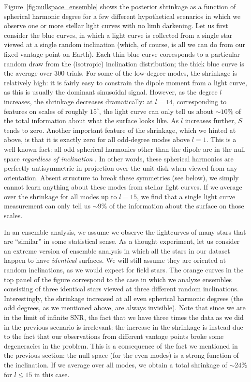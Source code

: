 \documentclass[modern]{aastex62}
\begin{document}
Figure~\ref{fig:nullspace_ensemble} shows the posterior shrinkage
as a function of spherical harmonic degree for a few different hypothetical
scenarios in which we observe one or more stellar light curves with
no limb darkening.
Let us first consider the blue curves, in which a light curve is
collected from a single star viewed at a single random inclination (which, of course, is
all we can do from our fixed vantage point on Earth).
Each thin blue curve corresponds to a particular random draw from the (isotropic)
inclination distribution; the thick blue curve is the average over 300 trials.
For some of the low-degree modes, the shrinkage is relatively high: it is
fairly easy to constrain the dipole moment from a light curve, as this is
usually the dominant sinusoidal signal. However, as the degree $l$
increases, the shrinkage decreases dramatically: at $l = 14$, corresponding
to features on scales of roughly $15^\circ$, the light curve
can only tell us about $\sim 10\%$ of the total information about what the
surface looks like. As $l$ increases further, $S$ tends to zero.
Another important feature of the shrinkage, which we hinted at above,
is that it is exactly zero for
all odd-degree modes above $l = 1$. This is a well-known fact: all odd spherical
harmonics other than the dipole are in the null space \emph{regardless of
    inclination} \citep[e.g.,][]{Luger2019}. In other words, these spherical
harmonics are perfectly antisymmetric in projection over the unit disk
when viewed from any orientation. Absent structure to break these symmetries
(see below), we simply cannot learn anything about these modes from
stellar light curves. If we average over the shrinkage for all modes up to $l=15$,
we find that a single light curve measurement can only tell us $\sim 9\%$
of the information about the surface on those scales.

In an ensemble analysis, we assume we observe the lightcurves of many stars
that are ``similar'' in some statistical sense. As a thought experiment,
let us consider an extreme version of ensemble analysis in which all the
stars in our dataset happen to have \emph{identical} surfaces. We will
still assume they are oriented at random inclinations, as we would expect for
field stars. The orange curves in the top panel of the figure correspond to
the case in which we analyze ensembles consisting of three identical stars
viewed at three different random inclinations.
Interestingly, the shrinkage increased at all even spherical harmonic degrees
(the odd degrees, as we mentioned above, are always invisible).
Note that since we are in the limit of infinite SNR, the fact that we have
three times the data as we did in the previous scenario is irrelevant: the
increase in the shrinkage is instead due to the fact that our observations
from different vantage points broke some degeneracies in the problem.
This is a consequence of the fact we mentioned in the previous section:
the null space (for the even modes)
is a strong function of the inclination.
If we average over all modes, we obtain a total shrinkage of $\sim 24\%$
for $l\leq15$ in this case.
\end{document}
